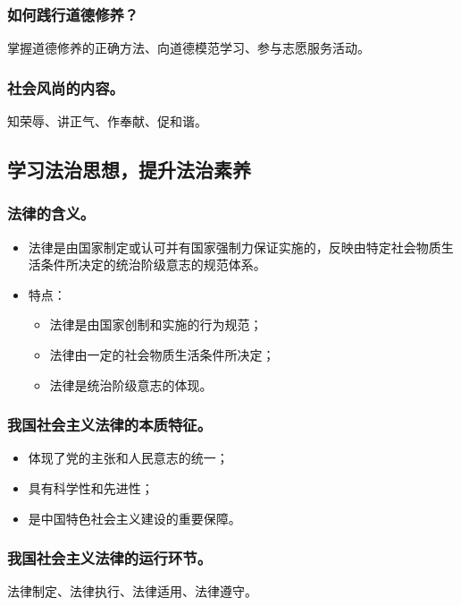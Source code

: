 \documentclass{article}
\begin{document}
\subsubsection{如何践行道德修养？}
掌握道德修养的正确方法、向道德模范学习、参与志愿服务活动。

\subsubsection{社会风尚的内容。}
知荣辱、讲正气、作奉献、促和谐。

\subsection{学习法治思想，提升法治素养}

\subsubsection{法律的含义。}
\begin{itemize}
    \item 法律是由国家制定或认可并有国家强制力保证实施的，反映由特定社会物质生活条件所决定的统治阶级意志的规范体系。
    \item 特点：
    \begin{itemize}
        \item 法律是由国家创制和实施的行为规范；
        \item 法律由一定的社会物质生活条件所决定；
        \item 法律是统治阶级意志的体现。
    \end{itemize}
\end{itemize}

\subsubsection{我国社会主义法律的本质特征。}
\begin{itemize}
    \item 体现了党的主张和人民意志的统一；
    \item 具有科学性和先进性；
    \item 是中国特色社会主义建设的重要保障。
\end{itemize}

\subsubsection{我国社会主义法律的运行环节。}
法律制定、法律执行、法律适用、法律遵守。
\end{document}
